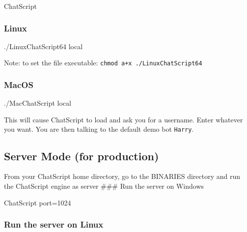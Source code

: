 \documentclass[]{article}
\newenvironment{Shaded}{}{}
\newcommand{\ExtensionTok}[1]{#1}
\newcommand{\NormalTok}[1]{#1}
\begin{document}
\begin{Shaded}
\begin{Highlighting}[]
\ExtensionTok{ChatScript}
\end{Highlighting}
\end{Shaded}

\subsubsection{Linux}\label{linux}

\begin{Shaded}
\begin{Highlighting}[]
\ExtensionTok{./LinuxChatScript64}\NormalTok{ local}
\end{Highlighting}
\end{Shaded}

Note: to set the file executable:
\texttt{chmod\ a+x\ ./LinuxChatScript64}

\subsubsection{MacOS}\label{macos}

\begin{Shaded}
\begin{Highlighting}[]
\ExtensionTok{./MacChatScript}\NormalTok{ local}
\end{Highlighting}
\end{Shaded}

This will cause ChatScript to load and ask you for a username. Enter
whatever you want. You are then talking to the default demo bot
\texttt{Harry}.

\subsection{Server Mode (for
production)}\label{server-mode-for-production}

From your ChatScript home directory, go to the BINARIES directory and
run the ChatScript engine as server \#\#\# Run the server on Windows

\begin{Shaded}
\begin{Highlighting}[]
\ExtensionTok{ChatScript}\NormalTok{ port=1024}
\end{Highlighting}
\end{Shaded}

\subsubsection{Run the server on Linux}\label{run-the-server-on-linux}
\end{document}
